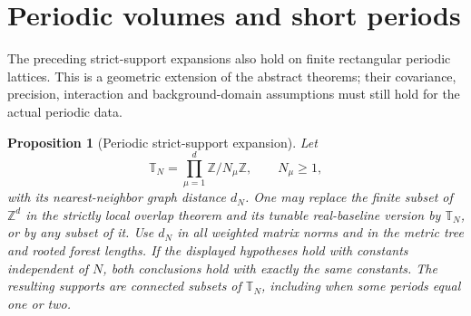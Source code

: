 \documentclass[11pt]{article}
\newtheorem{proposition}[theorem]{Proposition}
\theoremstyle{remark}\newtheorem{remark}[theorem]{Remark}
\begin{document}

\section{Periodic volumes and short periods}
\label{op-section}

The preceding strict-support expansions also hold on finite rectangular
periodic lattices. This is a geometric extension of the abstract theorems;
their covariance, precision, interaction and background-domain assumptions
must still hold for the actual periodic data.

\begin{proposition}[Periodic strict-support expansion]
\label{op-periodic-theorem}
Let
\[
 \mathbb T_N=\prod_{\mu=1}^{d}\mathbb Z/N_\mu\mathbb Z,
 \qquad N_\mu\ge1,
\]
with its nearest-neighbor graph distance $d_N$. One may replace the finite
subset of $\mathbb Z^d$ in the strictly local overlap theorem and its
tunable real-baseline version by $\mathbb T_N$, or by any subset of it.
Use $d_N$ in all weighted matrix norms and in the metric tree and rooted
forest lengths. If the displayed hypotheses hold with constants independent
of $N$, both conclusions hold with exactly the same constants. The resulting
supports are connected subsets of $\mathbb T_N$, including when some
periods equal one or two.
\end{proposition}
\end{document}
